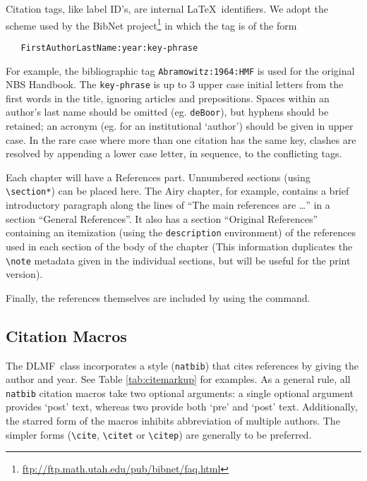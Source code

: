 \documentclass[twoside]{article}
\newcommand{\DLMF}{{\sc DLMF}}
\newcommand{\package}[1]{\texttt{#1}}
\newcommand{\token}[1]{\texttt{#1}}
\begin{document}
Citation tags, like label ID's, are internal \LaTeX\ identifiers.
We adopt the scheme used by the BibNet
 project\footnote{\url{ftp://ftp.math.utah.edu/pub/bibnet/faq.html}}
in which the tag is of the form
\begin{verbatim}
   FirstAuthorLastName:year:key-phrase
\end{verbatim}
For example, the bibliographic tag \texttt{Abramowitz:1964:HMF}  
is used for the original NBS Handbook. 
The \token{key-phrase} is up to 3 upper case initial letters from the first words
in the title, ignoring articles and prepositions. 
Spaces within an author's last name should be
omitted (eg. \texttt{deBoor}), but hyphens should be retained; an acronym (eg.
for an institutional `author') should be given in upper case.
In the rare case where more than one citation has the same key,  
clashes are resolved by appending
a lower case letter, in sequence, to the conflicting tags.

Each chapter will have a References part.  Unnumbered sections (using
\verb|\section*|) can be placed here.  The Airy chapter, for example, 
contains a brief introductory paragraph along the
 lines of ``The main references are \ldots''  in a section ``General References''.
It also has a section ``Original References'' containing an itemization
(using the \verb|description| environment) of the references used in each
section of the body of the chapter (This information duplicates the \verb|\note|
metadata given in the individual sections, but will be useful for the print version).

Finally, the references themselves are included by using 
the \verb|| command.

\subsection{Citation Macros}
The \DLMF\ class incorporates a style (\package{natbib}) that cites references by
giving the author and  year. See Table \ref{tab:citemarkup} for
examples. As a general rule, all \package{natbib} citation macros take two optional
arguments: a single optional argument provides `post' text, whereas 
two provide both `pre' and `post' text.  Additionally, the starred form of the
macros inhibits abbreviation of multiple authors.
The simpler forms (\verb|\cite|, \verb|\citet| or \verb|\citep|) are 
generally to be preferred.
\end{document}
